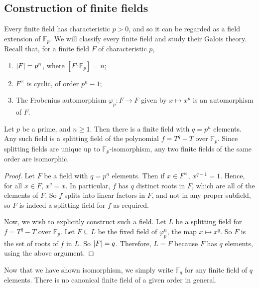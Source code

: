 \subsection{Construction of finite fields}
Every finite field has characteristic \( p > 0 \), and so it can be regarded as a field extension of \( \mathbb F_p \).
We will classify every finite field and study their Galois theory.
Recall that, for a finite field \( F \) of characteristic \( p \),
\begin{enumerate}
	\item \( \abs{F} = p^n \), where \( [F : \mathbb F_p] = n \);
	\item \( F^\times \) is cyclic, of order \( p^n - 1 \);
	\item The Frobenius automorphism \( \varphi_p \colon F \to F \) given by \( x \mapsto x^p \) is an automorphism of \( F \).
\end{enumerate}
\begin{theorem}
	Let \( p \) be a prime, and \( n \geq 1 \).
	Then there is a finite field with \( q = p^n \) elements.
	Any such field is a splitting field of the polynomial \( f = T^q - T \) over \( \mathbb F_p \).
	Since splitting fields are unique up to \( \mathbb F_p \)-isomorphism, any two finite fields of the same order are isomorphic.
\end{theorem}
\begin{proof}
	Let \( F \) be a field with \( q = p^n \) elements.
	Then if \( x \in F^\times \), \( x^{q-1} = 1 \).
	Hence, for all \( x \in F \), \( x^q = x \).
	In particular, \( f \) has \( q \) distinct roots in \( F \), which are all of the elements of \( F \).
	So \( f \) splits into linear factors in \( F \), and not in any proper subfield, so \( F \) is indeed a splitting field for \( f \) as required.

	Now, we wish to explicitly construct such a field.
	Let \( L \) be a splitting field for \( f = T^q - T \) over \( \mathbb F_p \).
	Let \( F \subseteq L \) be the fixed field of \( \varphi_p^n \), the map \( x \mapsto x^q \).
	So \( F \) is the set of roots of \( f \) in \( L \).
	So \( \abs{F} = q \).
	Therefore, \( L = F \) because \( F \) has \( q \) elements, using the above argument.
\end{proof}
Now that we have shown isomorphism, we simply write \( \mathbb F_q \) for any finite field of \( q \) elements.
There is no canonical finite field of a given order in general.

